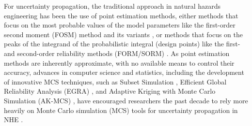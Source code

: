 For uncertainty propagation, the traditional approach in natural hazards engineering has been the use of point estimation methods, either methods that focus on the most probable values of the model parameters like the first-order second moment (FOSM) method \citep{baker2008uncertainty} and its variants \citep{vamvatsikos2013derivation}, or methods that focus on the peaks of the integrand of the probabilistic integral (design points) like the first- and second-order reliability methods (FORM/SORM) \citep{koduru2010feasibility}. As point estimation methods are inherently approximate, with no available means to control their accuracy, advances in computer science and statistics, including the development of innovative MCS techniques, such as Subset Simulation \citep{au2003subset}, Efficient Global Reliability Analysis (EGRA) \citep{bichon2013efficient}, and Adaptive Kriging with Monte Carlo Simulation (AK-MCS) \citep{echard2011akmcs}, have encouraged researchers the past decade to rely more heavily on Monte Carlo simulation (MCS) tools for uncertainty propagation in NHE \citep{smith2011monte, taflanidis2011simulationbased, vamvatsikos2014seismic, esposito2015simulation, deb2019parametric}. 

